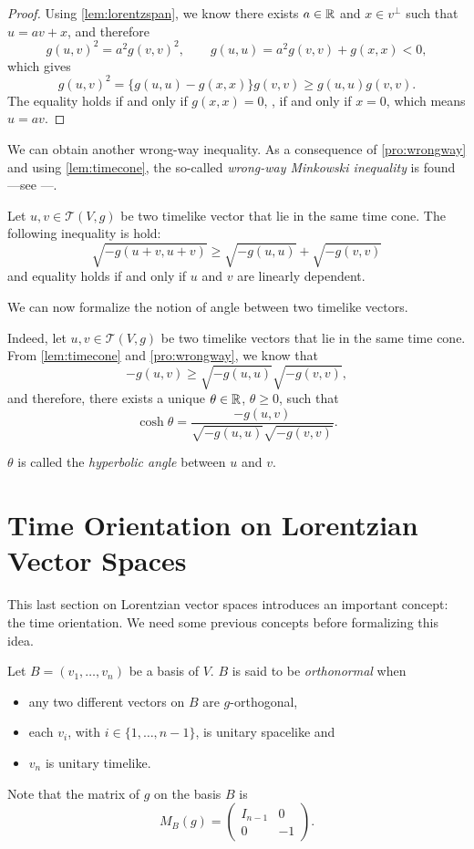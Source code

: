 \begin{proof}
    Using \autoref{lem:lorentzspan}, we know there exists $a \in \mathbb{R}$ and $x \in v^\perp$ such that $u=av+x$, and therefore
    \[
        g(u,v)^2=a^2g(v,v)^2, \quad \quad g(u,u)=a^2g(v,v)+g(x,x)<0,
    \]
    which gives
    \[
        g(u,v)^2=\{g(u,u)-g(x,x)\}g(v,v) \geq g(u,u)g(v,v).
    \]
    The equality holds if and only if $g(x,x)=0$, \ie, if and only if $x=0$, which means $u=av$.
\end{proof}


We can obtain another wrong-way inequality. As a consequence of \autoref{pro:wrongway} and using \autoref{lem:timecone}, the so-called \emph{wrong-way Minkowski inequality} is found ---see \cite[Cor. 5.31]{oneill83}---.

\begin{corollary}
	\label{Minkowski}
    Let $u,v \in \mathcal{T}(V,g)$ be two timelike vector that lie in the same time cone. The following inequality is hold:
    \[
        \sqrt{-g(u+v,u+v)} \geq \sqrt{-g(u,u)}+\sqrt{-g(v,v)}
    \]
    and equality holds if and only if $u$ and $v$ are linearly dependent.
\end{corollary}

We can now formalize the notion of angle between two timelike vectors.

Indeed, let $u, v \in \mathcal{T}(V,g)$ be two timelike vectors that lie in the same time cone. From \autoref{lem:timecone} and \autoref{pro:wrongway}, we know that
\[
-g(u,v) \geq \sqrt{-g(u,u)}\sqrt{-g(v,v)},
\]
and therefore, there exists a unique $\theta \in \mathbb{R}$, $\theta \geq 0$, such that
\[
\cosh \theta =\frac{-g(u,v)}{\sqrt{-g(u,u)}\sqrt{-g(v,v)}}.
\]

$\theta$ is called the \emph{hyperbolic angle} between $u$ and $v$.

\section{Time Orientation on Lorentzian Vector Spaces}

This last section on Lorentzian vector spaces introduces an important concept: the time orientation. We need some previous concepts before formalizing this idea.

\begin{definition}
	Let $B = (v_1, \dots, v_n)$ be a basis of $V$. $B$ is said to be \emph{orthonormal} when
	\begin{itemize}
		\item any two different vectors on $B$ are $g$-orthogonal,
		\item each $v_i$, with $i \in \{1,\dots,n-1\}$, is unitary spacelike and
		\item $v_n$ is unitary timelike.
	\end{itemize}

	Note that the matrix of $g$ on the basis $B$ is
	\[
		M_B(g) = \begin{pmatrix}
			I_{n-1} & 0  \\
			0 & -1
		\end{pmatrix}.
	\]
\end{definition}

